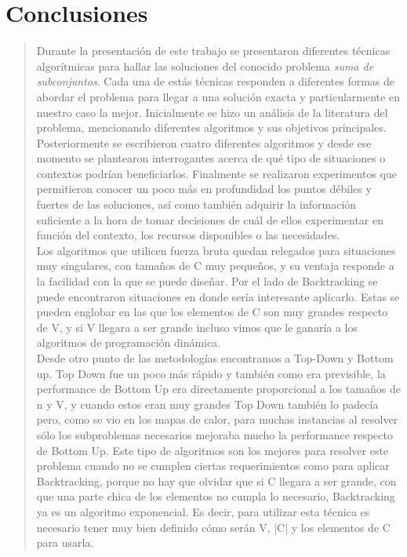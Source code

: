 \documentclass[8pt,a4paper]{article}
\begin{document}
\section{Conclusiones}

\begin{verse}
Durante la presentación de este trabajo se presentaron diferentes técnicas algorítmicas para hallar las soluciones del conocido problema {\it suma de subconjuntos}. Cada una de estás técnicas responden a diferentes formas de abordar el problema para llegar a una solución exacta y particularmente en nuestro caso la mejor. Inicialmente se hizo un análisis de la literatura del problema, mencionando diferentes algoritmos y sus objetivos principales. Posteriormente se escribieron cuatro diferentes algoritmos y desde ese momento se plantearon interrogantes acerca de qué tipo de situaciones o contextos podrían beneficiarlos. Finalmente se realizaron experimentos que permitieron conocer un poco más en profundidad los puntos débiles y fuertes de las soluciones, así como también adquirir la información suficiente a la hora de tomar decisiones de cuál de ellos experimentar en función del contexto, los recursos disponibles o las necesidades. \\
Los algoritmos que utilicen fuerza bruta quedan relegados para situaciones muy singulares, con tamaños de C muy pequeños, y su ventaja responde a la facilidad con la que se puede diseñar. Por el lado de Backtracking se puede encontraron situaciones en donde sería interesante aplicarlo. Estas se pueden englobar en las que los elementos de C son muy grandes respecto de V, y si V llegara a ser grande incluso vimos que le ganaría a los algoritmos de programación dinámica.
\\
Desde otro punto de las metodologías encontramos a Top-Down y Bottom up. Top Down fue un poco más rápido y también como era previsible, la performance de Bottom Up era directamente proporcional a los tamaños de n y V, y cuando estos eran muy grandes Top Down también lo padecía pero, como se vio en los mapas de calor, para muchas instancias al resolver sólo los subproblemas necesarios mejoraba mucho la performance respecto de Bottom Up. Este tipo de algoritmos son los mejores para resolver este problema cuando no se cumplen ciertas requerimientos como para aplicar Backtracking, porque no hay que olvidar que si C llegara a ser grande, con que una parte chica de los elementos no cumpla lo necesario, Backtracking ya es un algoritmo exponencial. Es decir, para utilizar esta técnica es necesario tener muy bien definido cómo serán V, |C| y los elementos de C para usarla. \\
\end{verse}
\end{document}
